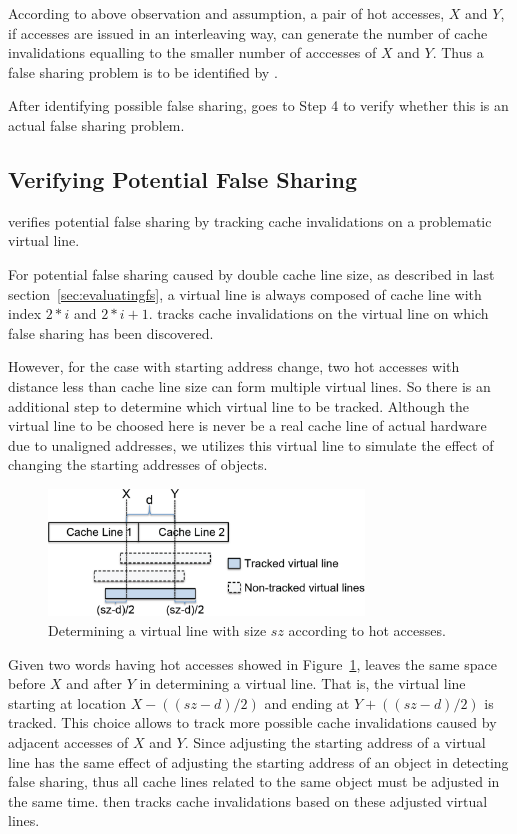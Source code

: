 According to above observation and assumption, 
a pair of hot accesses, $X$ and $Y$, if accesses are issued in an interleaving 
way, can generate the number of cache invalidations equalling to 
the smaller number of acccesses of $X$ and $Y$.
Thus a false sharing problem is to be identified by \Predator{}.
  
After identifying possible false sharing, \Predator{} goes to Step 4 to 
verify whether this is an actual false sharing problem.

\subsection{Verifying Potential False Sharing}
\label{sec:tracking}

\Predator{} verifies potential false sharing by tracking 
cache invalidations on a problematic virtual line.

For potential false sharing caused by double cache line size, as described in
last section~\ref{sec:evaluatingfs}, a virtual line is always composed of 
cache line with index $2*i$ and $2*i+1$. 
\Predator{} tracks cache invalidations
on the virtual line on which false sharing has been discovered.

However, for the case with starting address change, 
two hot accesses with distance less than cache line size 
can form multiple virtual lines. 
So there is an additional step to determine which virtual line to be tracked.
Although the virtual line to be choosed here is never be a real cache line of actual hardware
due to unaligned addresses,
we utilizes this virtual line to simulate the effect of changing the 
starting addresses of objects.


\begin{figure}
\begin{center} 
\includegraphics[width=3.3in]{fig/trackpotential}
\end{center}
\caption{Determining a virtual line with size $sz$ according to hot accesses.}
\label{fig:trackpotential}
\end{figure}

Given two words having hot accesses showed in Figure~\ref{fig:trackpotential}, 
\Predator{} leaves the same space before $X$ and after $Y$ in determining a virtual line. 
That is, the virtual line starting 
at location $X-((sz-d)/2)$ and ending at $Y+((sz-d)/2)$ is tracked. 
This choice allows to track more possible cache invalidations caused by
adjacent accesses of $X$ and $Y$. 
Since adjusting the starting address of a virtual line has the same effect of
adjusting the starting address of an object in detecting false sharing, thus
all cache lines related to the same object must be adjusted in the same time.
\Predator{} then tracks cache invalidations based on these adjusted virtual lines.

